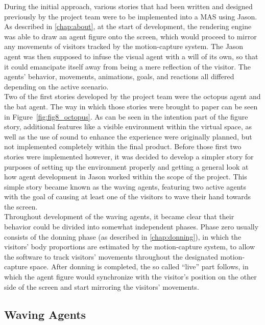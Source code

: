 \documentclass[draft,final]{vutinfth} %
\begin{document}
During the initial approach, various stories that had been written and designed previously by the project team were to be implemented into a MAS using Jason. 
As described in \autoref{chap:about}, at the start of development, the rendering engine was able to draw an agent figure onto the screen, which would proceed to mirror any movements of visitors tracked by the motion-capture system. 
The Jason agent was then supposed to infuse the visual agent with a will of its own, so that it could emancipate itself away from being a mere reflection of the visitor. 
The agents’ behavior, movements, animations, goals, and reactions all differed depending on the active scenario. \\
Two of the first stories developed by the project team were the octopus agent and the bat agent. 
The way in which those stories were brought to paper can be seen in Figure~\ref{fig:fig8_octopus}. 
As can be seen in the intention part of the figure story, additional features like a visible environment within the virtual space, as well as the use of sound to enhance the experience were originally planned, but not implemented completely within the final product. 
Before those first two stories were implemented however, it was decided to develop a simpler story for purposes of setting up the environment properly and getting a general look at how agent development in Jason worked within the scope of the project. 
This simple story became known as the waving agents, featuring two active agents with the goal of causing at least one of the visitors to wave their hand towards the screen. \\
Throughout development of the waving agents, it became clear that their behavior could be divided into somewhat independent phases. 
Phase zero usually consists of the donning phase (as described in \autoref{chap:donning}), in which the visitors’ body proportions are estimated by the motion-capture system, to allow the software to track visitors’ movements throughout the designated motion-capture space. 
After donning is completed, the so called “live” part follows, in which the agent figure would synchronize with the visitor’s position on the other side of the screen and start mirroring the visitors’ movements.

\subsection{Waving Agents}
\label{chap:waving}
\end{document}
